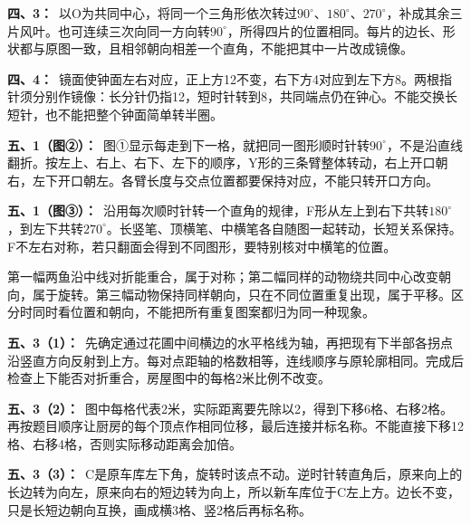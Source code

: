 \documentclass[multi=snippet,border=0pt]{standalone}
\newenvironment{snippet}[3]{\begin{minipage}{#1bp}\color{answerred}\fontsize{#2}{#3}\selectfont\raggedright}{\end{minipage}}
\begin{document}
\begin{snippet}{505}{11.5}{14}\textbf{四、3：}\ 以O为共同中心，将同一个三角形依次转过\(90^\circ\)、\(180^\circ\)、\(270^\circ\)，补成其余三片风叶。也可连续三次向同一方向转\(90^\circ\)，所得四片的位置相同。每片的边长、形状都与原图一致，且相邻朝向相差一个直角，不能把其中一片改成镜像。\end{snippet}
\begin{snippet}{505}{11.5}{14}\textbf{四、4：}\ 镜面使钟面左右对应，正上方12不变，右下方4对应到左下方8。两根指针须分别作镜像：长分针仍指12，短时针转到8，共同端点仍在钟心。不能交换长短针，也不能把整个钟面简单转半圈。\end{snippet}
\begin{snippet}{505}{11.5}{14}\textbf{五、1（图②）：}\ 图①显示每走到下一格，就把同一图形顺时针转\(90^\circ\)，不是沿直线翻折。按左上、右上、右下、左下的顺序，Y形的三条臂整体转动，右上开口朝右，左下开口朝左。各臂长度与交点位置都要保持对应，不能只转开口方向。\end{snippet}
\begin{snippet}{505}{11.5}{14}\textbf{五、1（图③）：}\ 沿用每次顺时针转一个直角的规律，F形从左上到右下共转\(180^\circ\)，到左下共转\(270^\circ\)。长竖笔、顶横笔、中横笔各自随图一起转动，长短关系保持。F不左右对称，若只翻面会得到不同图形，要特别核对中横笔的位置。\end{snippet}
\begin{snippet}{505}{11.5}{14}第一幅两鱼沿中线对折能重合，属于对称；第二幅同样的动物绕共同中心改变朝向，属于旋转。第三幅动物保持同样朝向，只在不同位置重复出现，属于平移。区分时同时看位置和朝向，不能把所有重复图案都归为同一种现象。\end{snippet}
\begin{snippet}{505}{11.5}{14}\textbf{五、3（1）：}\ 先确定通过花圃中间横边的水平格线为轴，再把现有下半部各拐点沿竖直方向反射到上方。每对点距轴的格数相等，连线顺序与原轮廓相同。完成后检查上下能否对折重合，房屋图中的每格2米比例不改变。\end{snippet}
\begin{snippet}{505}{11.5}{14}\textbf{五、3（2）：}\ 图中每格代表2米，实际距离要先除以2，得到下移6格、右移2格。再按题目顺序让厨房的每个顶点作相同位移，最后连接并标名称。不能直接下移12格、右移4格，否则实际移动距离会加倍。\end{snippet}
\begin{snippet}{505}{11.5}{14}\textbf{五、3（3）：}\ C是原车库左下角，旋转时该点不动。逆时针转直角后，原来向上的长边转为向左，原来向右的短边转为向上，所以新车库位于C左上方。边长不变，只是长短边朝向互换，画成横3格、竖2格后再标名称。\end{snippet}
\end{document}
